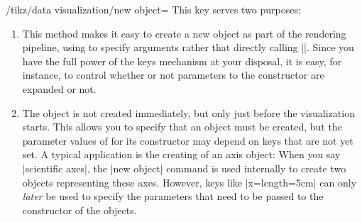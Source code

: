 \begin{key}{/tikz/data visualization/new object=}
  This key serves two purposes:
  \begin{enumerate}
  \item
    This method makes it easy to create a new object as part of the
    rendering pipeline, using  to specify arguments rather
    that directly calling |\pgfoonew|. Since you have the full power
    of the keys mechanism at your disposal, it is easy, for instance,
    to control whether or not parameters to the constructor are
    expanded or not.
  \item
    The object is not created immediately, but only just before the
    visualization starts. This allows you to specify that an object
    must be created, but the parameter values of for its constructor
    may depend on keys that are not yet set. A typical application is
    the creating of an axis object: When you say |scientific axes|,
    the |new object| command is used internally to create two
    objects representing these axes. However, keys like
    |x={length=5cm}| can only \emph{later} be used to specify the
    parameters that need to be passed to the constructor of the
    objects.
  \end{enumerate}


\end{key}
